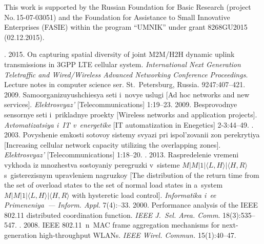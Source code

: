 \Ack
\noindent
This work is supported by the Russian Foundation for 
Basic Research (project No.\,15-07-03051) and the Foundation for Assistance to 
Small Innovative Enterprises (FASIE) within the program ``UMNIK'' 
under grant 8268GU2015 (02.12.2015).


\vspace*{9pt}

  \begin{multicols}{2}

\renewcommand{\bibname}{\protect\rmfamily References}

{\small\frenchspacing
 {%
 \begin{thebibliography}{99}
. 2015. On capturing spatial diversity 
of joint M2M/H2H dynamic uplink transmissions in 3GPP LTE cellular 
system. \textit{International Next Generation Teletraffic and Wired/Wireless 
Advanced Networking Conference Proceedings}. 
Lecture notes in computer science ser. St.\ Petersburg, Russia.  9247:407--421.
 2009. Samoorganizuyushchiesya seti i~novye 
uslugi [Ad hoc networks and new services]. \textit{Elektrosvyaz'} 
[Telecommunications] 1:19--23.
 2009. Besprovodnye sensornye seti i~prikladnye proekty 
[Wireless networks and application projects]. \textit{Avtomatizatsiya i~IT 
v~energetike} [IT automatization in Enegetics] 2-3:44--49.
. 2003. Povyshenie emkosti sotovoy 
sistemy svyazi pri ispol'zovanii zon perekrytiya [Increasing cellular network 
capacity utilizing the overlapping zones]. \textit{Elektrosvyaz'} 
[Telecommunications] 1:18--20.
. 2013. Raspredelenie vremeni vykhoda iz mnozhestva 
sostoyaniy peregruzki v~sisteme $M|M|1|\langle L,H \rangle |\langle H,R 
\rangle$ s~gisterezisnym upravleniem nagruzkoy [The distribution of the return 
time from the set of overload states to the set of normal load states in a~system 
$M|M|1|\langle L,H \rangle |\langle H,R \rangle$ with hysteretic load control]. 
\textit{Informatika i~ee Primeneniya~--- Inform. Appl.} 7(4):--33.
 2000. Performance analysis of the IEEE 802.11 distributed 
coordination function. \textit{IEEE J.~Sel. Area. Comm}. 
18(3):535--547.
. 2008. IEEE 802.11~n~MAC frame aggregation mechanisms 
for next-generation high-throughput WLANs. \textit{IEEE Wirel. 
Commun.} 15(1):40--47.



\end{thebibliography}}}
\end{multicols}
